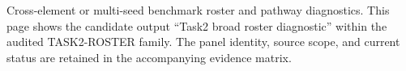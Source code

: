 Cross-element or multi-seed benchmark roster and pathway diagnostics. This page shows the candidate output ``Task2 broad roster diagnostic'' within the audited TASK2-ROSTER family. The panel identity, source scope, and current status are retained in the accompanying evidence matrix.
